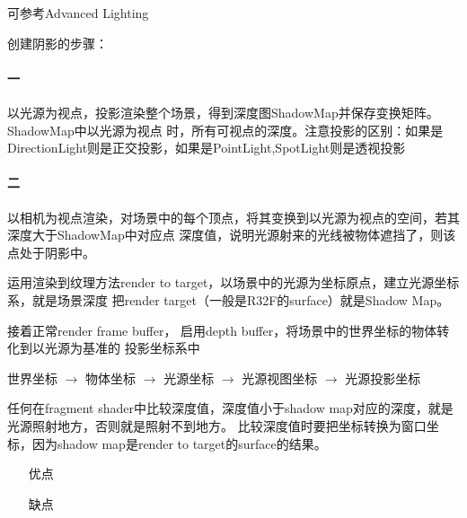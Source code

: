 可参考Advanced Lighting\cite{LearnOpenGL}

创建阴影的步骤：
\paragraph{一} 
以光源为视点，投影渲染整个场景，得到深度图ShadowMap并保存变换矩阵。ShadowMap中以光源为视点
时，所有可视点的深度。注意投影的区别：如果是DirectionLight则是正交投影，如果是PointLight,SpotLight则是透视投影

\paragraph{二}
以相机为视点渲染，对场景中的每个顶点，将其变换到以光源为视点的空间，若其深度大于ShadowMap中对应点
深度值，说明光源射来的光线被物体遮挡了，则该点处于阴影中。

运用渲染到纹理方法render to target，以场景中的光源为坐标原点，建立光源坐标系，就是场景深度
把render target（一般是R32F的surface）就是Shadow Map。 

接着正常render frame buffer， 启用depth buffer，将场景中的世界坐标的物体转化到以光源为基准的
投影坐标系中

世界坐标 $\rightarrow$ 物体坐标 $\rightarrow$ 光源坐标 $\rightarrow$ 光源视图坐标 $\rightarrow$ 光源投影坐标

任何在fragment shader中比较深度值，深度值小于shadow map对应的深度，就是光源照射地方，否则就是照射不到地方。
比较深度值时要把坐标转换为窗口坐标，因为shadow map是render to target的surface的结果。

\begin{itemize}
    \item [优点] 
    \item [缺点] 
\end{itemize}


